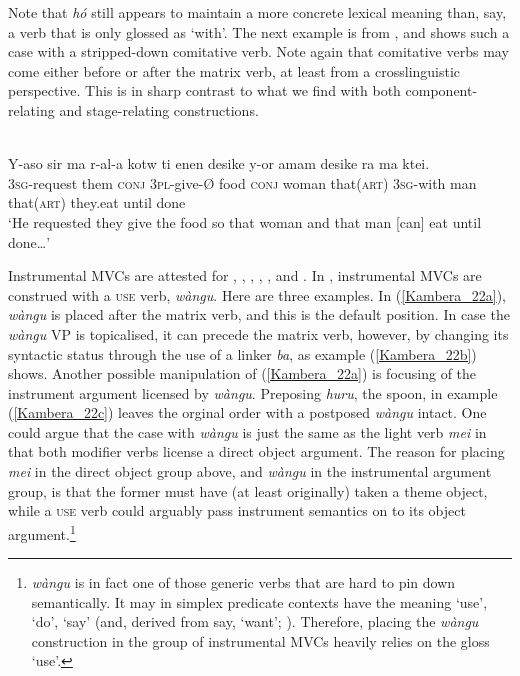 Note that \textit{hó} still appears to maintain a more concrete lexical meaning than, say, a verb that is only glossed as `with'. The next example is from , and shows such a case with a stripped-down comitative verb. Note again that comitative verbs may come either before or after the matrix verb, at least from a crosslinguistic perspective. This is in sharp contrast to what we find with both component-relating and stage-relating constructions.

\ea 
{}\\
\gll Y-aso sir ma r-al-a kotw ti enen desike y-or amam desike ra ma ktei. \\
3\textsc{sg}-request them \textsc{conj} 3\textsc{pl}-give-Ø food \textsc{conj} woman that(\textsc{art}) 3\textsc{sg}-with man that(\textsc{art}) they.eat until done \\
\glft `He requested they give the food so that woman and that man [can] eat until done{\dots}'\\ 
\z

\largerpage[-1]
Instrumental MVCs are attested for , , , , , and . In , instrumental MVCs are construed with a \textsc{use} verb, \textit{wàngu}. Here are three examples. In (\ref{Kambera_22a}), \textit{wàngu} is placed after the matrix verb, and this is the default position. In case the \textit{wàngu} VP is topicalised, it can precede the matrix verb, however, by changing its syntactic status through the use of a linker \textit{ba}, as example (\ref{Kambera_22b}) shows. Another possible manipulation of (\ref{Kambera_22a}) is focusing of the instrument argument licensed by \textit{wàngu}. Preposing \textit{huru}, the spoon, in example (\ref{Kambera_22c}) leaves the orginal order with a postposed \textit{wàngu} intact. One could argue that the  case with \textit{wàngu} is just the same as the  light verb \textit{mei} in that both modifier verbs license a direct object argument. The reason for placing \textit{mei} in the direct object group above, and \textit{wàngu} in the instrumental argument group, is that the former must have (at least originally) taken a theme object, while a \textsc{use} verb could arguably pass instrument semantics on to its object argument.\footnote{ \textit{wàngu} is in fact one of those generic verbs that are hard to pin down semantically. It may in simplex predicate contexts have the meaning `use', `do', `say' (and, derived from say, `want'; \citealt[284ff.]{klamer1998grammar}). Therefore, placing the \textit{wàngu} construction in the group of instrumental MVCs heavily relies on the gloss `use'.}

